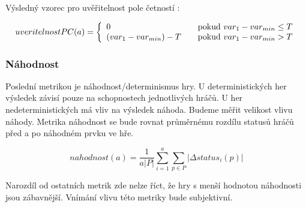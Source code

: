 Výsledný vzorec pro uvěřitelnost pole četností :

	\[
	uveritelnostPC(a) = \left\{
  \begin{array}{l l}
    0 & \quad \text{pokud $var_1 - var_{min} \leq T$}\\
    (var_1 - var_{min}) - T & \quad \text{pokud $var_1 - var_{min} > T$}
  \end{array} \right.
\]


\subsubsection{Náhodnost}

Poslední metrikou je náhodnost/determinismus hry. U deterministických her výsledek závisí pouze na schopnostech jednotlivých hráčů. U her nedeterministických má vliv na výsledek náhoda. Budeme měřit velikost vlivu náhody. Metrika náhodnost se bude rovnat průměrnému rozdílu statusů hráčů před a po náhodném prvku ve hře.

	\[
	nahodnost(a) = \frac{1}{a |P|}\sum_{i=1}^a{\sum_{p \in P} |\Delta status_i(p)|}
\]

Narozdíl od ostatních metrik zde nelze říct, že hry s menší hodnotou náhodnosti jsou zábavnější. Vnímání vlivu této metriky bude subjektivní.
